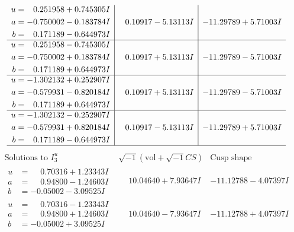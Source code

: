\documentclass[1p]{elsarticle_modified}
\theoremstyle{definition}
\newcommand{\I}{\sqrt{-1}}
\begin{document}
$$\begin{array}{c|c|c}
\begin{aligned}
u &= \phantom{-}0.251958 + 0.745305 I \\
a &= -0.750002 - 0.183784 I \\
b &= \phantom{-}0.171189 - 0.644973 I\end{aligned}
 & \phantom{-}0.10917 - 5.13113 I & -11.29789 + 5.71003 I \\ \hline\begin{aligned}
u &= \phantom{-}0.251958 - 0.745305 I \\
a &= -0.750002 + 0.183784 I \\
b &= \phantom{-}0.171189 + 0.644973 I\end{aligned}
 & \phantom{-}0.10917 + 5.13113 I & -11.29789 - 5.71003 I \\ \hline\begin{aligned}
u &= -1.302132 + 0.252907 I \\
a &= -0.579931 - 0.820184 I \\
b &= \phantom{-}0.171189 + 0.644973 I\end{aligned}
 & \phantom{-}0.10917 + 5.13113 I & -11.29789 - 5.71003 I \\ \hline\begin{aligned}
u &= -1.302132 - 0.252907 I \\
a &= -0.579931 + 0.820184 I \\
b &= \phantom{-}0.171189 - 0.644973 I\end{aligned}
 & \phantom{-}0.10917 - 5.13113 I & -11.29789 + 5.71003 I\\
 \hline 
 \end{array}$$\newpage$$\begin{array}{c|c|c}  
\text{Solutions to }I^u_{3}& \I (\text{vol} + \sqrt{-1}CS) & \text{Cusp shape}\\
 \hline 
\begin{aligned}
u &= \phantom{-}0.70316 + 1.23343 I \\
a &= \phantom{-}0.94800 - 1.24603 I \\
b &= -0.05002 - 3.09525 I\end{aligned}
 & \phantom{-}10.04640 + 7.93647 I & -11.12788 - 4.07397 I \\ \hline\begin{aligned}
u &= \phantom{-}0.70316 - 1.23343 I \\
a &= \phantom{-}0.94800 + 1.24603 I \\
b &= -0.05002 + 3.09525 I\end{aligned}
 & \phantom{-}10.04640 - 7.93647 I & -11.12788 + 4.07397 I \\ \hline\begin{aligned}

\end{aligned}
\end{array}$$
\end{document}
